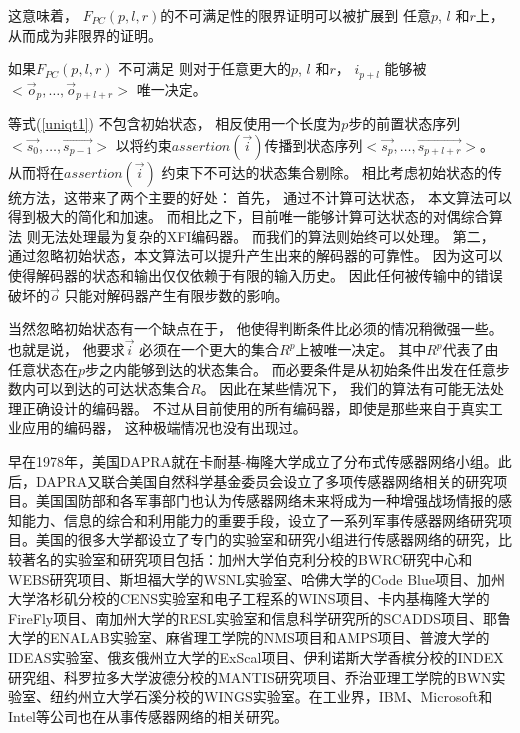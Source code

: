这意味着，
$F_{PC}(p,l,r)$的不可满足性的限界证明可以被扩展到
任意$p$, $l$ 和$r$上，
从而成为非限界的证明。

\begin{proposition}\label{prop_pc1}
如果$F_{PC}(p,l,r)$ 不可满足
则对于任意更大的$p$, $l$ 和$r$，
$i_{p+l}$ 能够被$<\vec{o}_{p},\dots,\vec{o}_{p+l+r}>$ 唯一决定。
\end{proposition}

等式(\ref{uniqt1}) 不包含初始状态，
相反使用一个长度为$p$步的前置状态序列$<\vec{s_0},\dots,\vec{s_{p-1}}>$
以将约束$assertion(\vec{i})$传播到状态序列$<\vec{s_p},\dots,\vec{s_{p+l+r}}>$。
从而将在$assertion(\vec{i})$ 约束下不可达的状态集合剔除。
相比考虑初始状态的传统方法，这带来了两个主要的好处：
首先，
通过不计算可达状态，
本文算法可以得到极大的简化和加速。
而相比之下，目前唯一能够计算可达状态的对偶综合算法
则无法处理最为复杂的XFI编码器。
而我们的算法则始终可以处理。
第二，
通过忽略初始状态，本文算法可以提升产生出来的解码器的可靠性。
因为这可以使得解码器的状态和输出仅仅依赖于有限的输入历史。
因此任何被传输中的错误破坏的$\vec{o}$ 只能对解码器产生有限步数的影响。

当然忽略初始状态有一个缺点在于，
他使得判断条件比必须的情况稍微强一些。
也就是说，
他要求$\vec{i}$ 必须在一个更大的集合$R^p$上被唯一决定。
其中$R^p$代表了由任意状态在$p$步之内能够到达的状态集合。
而必要条件是从初始条件出发在任意步数内可以到达的可达状态集合$R$。
因此在某些情况下，
我们的算法有可能无法处理正确设计的编码器。
不过从目前使用的所有编码器，即使是那些来自于真实工业应用的编码器，
这种极端情况也没有出现过。







早在1978年，美国DAPRA就在卡耐基-梅隆大学成立了分布式传感器网络小组。此后，DAPRA又联合美国自然科学基金委员会设立了多项传感器网络相关的研究项目。美国国防部和各军事部门也认为传感器网络未来将成为一种增强战场情报的感知能力、信息的综合和利用能力的重要手段，设立了一系列军事传感器网络研究项目。美国的很多大学都设立了专门的实验室和研究小组进行传感器网络的研究，比较著名的实验室和研究项目包括：加州大学伯克利分校的BWRC研究中心和WEBS研究项目、斯坦福大学的WSNL实验室、哈佛大学的Code Blue项目、加州大学洛杉矶分校的CENS实验室和电子工程系的WINS项目、卡内基梅隆大学的FireFly项目、南加州大学的RESL实验室和信息科学研究所的SCADDS项目、耶鲁大学的ENALAB实验室、麻省理工学院的NMS项目和AMPS项目、普渡大学的IDEAS实验室、俄亥俄州立大学的ExScal项目、伊利诺斯大学香槟分校的INDEX研究组、科罗拉多大学波德分校的MANTIS研究项目、乔治亚理工学院的BWN实验室、纽约州立大学石溪分校的WINGS实验室。在工业界，IBM、Microsoft和Intel等公司也在从事传感器网络的相关研究。

